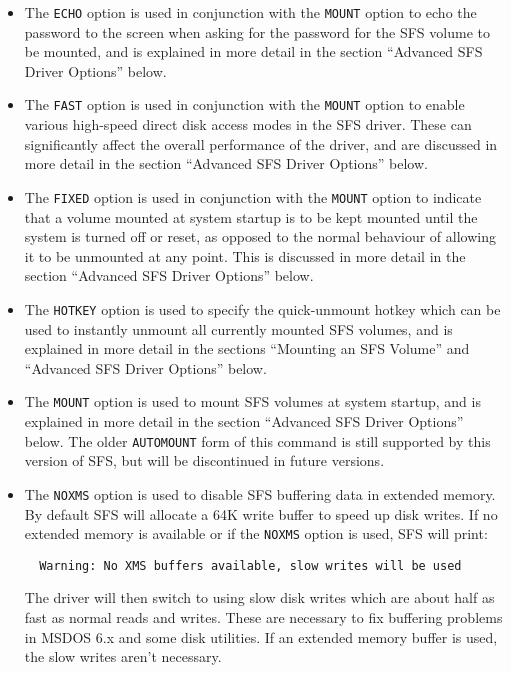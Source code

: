 \begin{itemize}

\item The {\tt ECHO} option is used in conjunction with the {\tt MOUNT} option to echo the
  password to the screen when asking for the password for the SFS volume to be
  mounted, and is explained in more detail in the section ``Advanced SFS
  Driver Options'' below.

\item The {\tt FAST} option is used in conjunction with the {\tt MOUNT} option to enable
  various high-speed direct disk access modes in the SFS driver.  These can
  significantly affect the overall performance of the driver, and are discussed
  in more detail in the section ``Advanced SFS Driver Options'' below.

\item The {\tt FIXED} option is used in conjunction with the {\tt MOUNT} option to indicate
   that a volume mounted at system startup is to be kept mounted until the
   system is turned off or reset, as opposed to the normal behaviour of allowing
   it to be unmounted at any point.  This is discussed in more detail in the
   section ``Advanced SFS Driver Options'' below.

\item The {\tt HOTKEY} option is used to specify the quick-unmount hotkey which can be
  used to instantly unmount all currently mounted SFS volumes, and is explained
  in more detail in the sections ``Mounting an SFS Volume'' and ``Advanced SFS
  Driver Options'' below.

\item The {\tt MOUNT} option is used to mount SFS volumes at system startup, and is
  explained in more detail in the section ``Advanced SFS Driver Options'' below.
  The older {\tt AUTOMOUNT} form of this command is still supported by this version
  of SFS, but will be discontinued in future versions.

\item The {\tt NOXMS} option is used to disable SFS buffering data in extended memory.
  By default SFS will allocate a 64K write buffer to speed up disk writes.  If
  no extended memory is available or if the {\tt NOXMS} option is used, SFS will
  print:

  {\tt \verb|  |Warning: No XMS buffers available, slow writes will be used}

  The driver will then switch to using slow disk writes which are about half as
  fast as normal reads and writes.  These are necessary to fix buffering
  problems in MSDOS 6.x and some disk utilities.  If an extended memory buffer
  is used, the slow writes aren't necessary.


\end{itemize}
